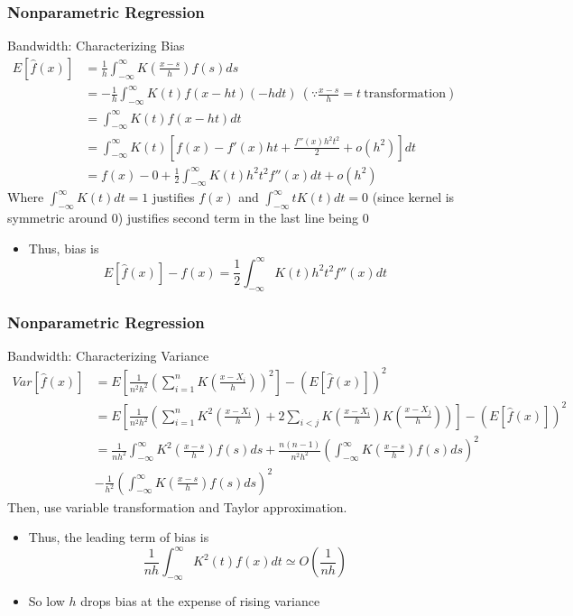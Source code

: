 \documentclass{beamer}
\begin{document}
\begin{frame}
\frametitle{Nonparametric Regression}
Bandwidth: Characterizing Bias
\footnotesize{\begin{align*}
E[\hat{f}(x)]&=\frac{1}{h}\int_{-\infty}^\infty K\left(\frac{x-s}{h}\right)f(s)ds\\
&=-\frac{1}{h}\int_{-\infty}^\infty K(t)f(x-ht)(-hdt) \ (\because \frac{x-s}{h}=t \ \text{transformation})\\
&=\int_{-\infty}^\infty K(t)f(x-ht)dt\\
&=\int_{-\infty}^\infty K(t)\left[f(x)-f'(x)ht + \frac{f''(x)h^2t^2}{2}+o(h^2)\right]dt\\
&=f(x)-0+\frac{1}{2}\int_{-\infty}^\infty K(t)h^2t^2f''(x)dt + o(h^2)
\end{align*}}\normalsize
Where $\int_{-\infty}^\infty K(t)dt=1$ justifies $f(x)$ and $\int_{-\infty}^\infty tK(t)dt=0$ (since kernel is symmetric around 0) justifies second term in the last line being 0
\begin{itemize}
\item Thus, bias is
\[
E[\hat{f}(x)]-f(x)=\frac{1}{2}\int_{-\infty}^\infty K(t)h^2t^2f''(x)dt
\]
\end{itemize}
\end{frame}

\begin{frame}
\frametitle{Nonparametric Regression}
Bandwidth: Characterizing Variance
\scriptsize{\begin{align*}
Var[\hat{f}(x)]&=E\left[\frac{1}{n^2h^2}\left(\sum_{i=1}^nK\left(\frac{x-X_i}{h}\right)\right)^2\right]-(E[\hat{f}(x)])^2\\
&=E\left[\frac{1}{n^2h^2}\left(\sum_{i=1}^nK^2\left(\frac{x-X_i}{h}\right)+2\sum_{i<j} K\left(\frac{x-X_i}{h}\right)K\left(\frac{x-X_j}{h}\right)\right)\right]-(E[\hat{f}(x)])^2\\
&=\frac{1}{nh^2}\int_{-\infty}^\infty K^2\left(\frac{x-s}{h}\right)f(s)ds+\frac{n(n-1)}{n^2h^2}\left(\int_{-\infty}^\infty K\left(\frac{x-s}{h}\right)f(s)ds\right)^2\\
&-\frac{1}{h^2}\left(\int_{-\infty}^\infty K\left(\frac{x-s}{h}\right)f(s)ds\right)^2
 \end{align*}}\normalsize
Then, use variable transformation and Taylor approximation. 
\begin{itemize}
\item Thus, the leading term of bias is 
\[
\frac{1}{nh}\int_{-\infty}^\infty K^2(t)f(x)dt\simeq O\left(\frac{1}{nh}\right)
\]
\item So low $h$ drops bias at the expense of rising variance
\end{itemize}
\end{frame}
\end{document}
